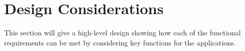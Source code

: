 
\section{Design Considerations}

This section will give a high-level design showing how each of the functional requirements can be met by considering key functions for the applications.




